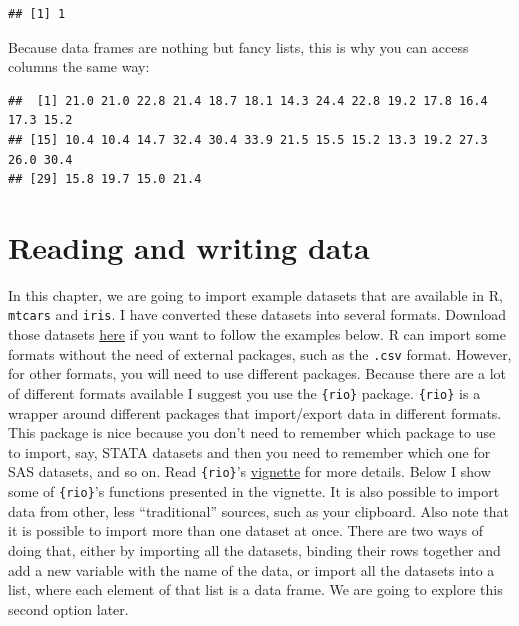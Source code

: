 \documentclass[]{gitbook}
\newenvironment{Shaded}{\begin{snugshade}}{\end{snugshade}}
\newcommand{\NormalTok}[1]{#1}
\newcommand{\OperatorTok}[1]{\textcolor[rgb]{0.81,0.36,0.00}{\textbf{#1}}}
\theoremstyle{definition}
\theoremstyle{definition}
\theoremstyle{definition}
\theoremstyle{remark}
\begin{document}
\begin{verbatim}
## [1] 1
\end{verbatim}

Because data frames are nothing but fancy lists, this is why you can
access columns the same way:

\begin{Shaded}
\end{Shaded}

\begin{verbatim}
##  [1] 21.0 21.0 22.8 21.4 18.7 18.1 14.3 24.4 22.8 19.2 17.8 16.4 17.3 15.2
## [15] 10.4 10.4 14.7 32.4 30.4 33.9 21.5 15.5 15.2 13.3 19.2 27.3 26.0 30.4
## [29] 15.8 19.7 15.0 21.4
\end{verbatim}

\hypertarget{reading-and-writing-data}{%
\section{Reading and writing data}\label{reading-and-writing-data}}

In this chapter, we are going to import example datasets that are
available in R, \texttt{mtcars} and \texttt{iris}. I have converted
these datasets into several formats. Download those datasets
\href{https://github.com/b-rodrigues/modern_R/tree/master/datasets}{here}
if you want to follow the examples below. R can import some formats
without the need of external packages, such as the \texttt{.csv} format.
However, for other formats, you will need to use different packages.
Because there are a lot of different formats available I suggest you use
the \texttt{\{rio\}} package. \texttt{\{rio\}} is a wrapper around
different packages that import/export data in different formats. This
package is nice because you don't need to remember which package to use
to import, say, STATA datasets and then you need to remember which one
for SAS datasets, and so on. Read \texttt{\{rio\}}'s
\href{https://cran.r-project.org/web/packages/rio/vignettes/rio.html}{vignette}
for more details. Below I show some of \texttt{\{rio\}}'s functions
presented in the vignette. It is also possible to import data from
other, less ``traditional'' sources, such as your clipboard. Also note
that it is possible to import more than one dataset at once. There are
two ways of doing that, either by importing all the datasets, binding
their rows together and add a new variable with the name of the data, or
import all the datasets into a list, where each element of that list is
a data frame. We are going to explore this second option later.
\end{document}
